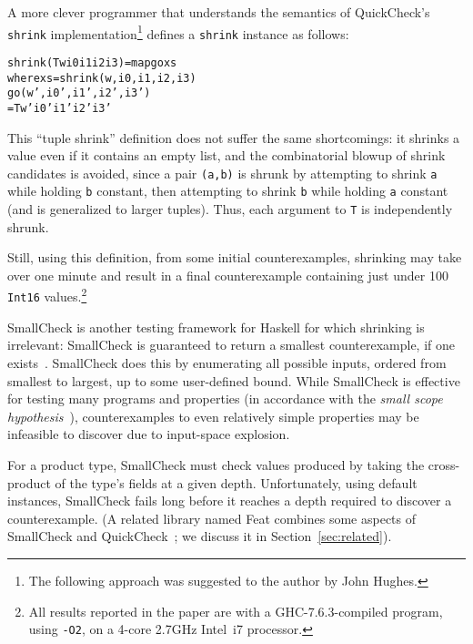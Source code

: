 \documentclass{sigplanconf}
\newenvironment{code}{\begin{alltt}\footnotesize}{\end{alltt}}
\newcommand{\ttp}[1]{\texttt{#1}}
\begin{document}
A more clever programmer that understands the semantics of QuickCheck's
\ttp{shrink} implementation\footnote{The following approach was suggested to
  the author by John Hughes.} defines a \ttp{shrink} instance as follows:
%
\begin{code}
shrink (T w i0 i1 i2 i3) = map go xs
  where xs = shrink (w, i0, i1, i2, i3)
        go (w', i0', i1', i2', i3')
           = T w' i0' i1' i2' i3'
\end{code}
%
\noindent
This ``tuple shrink'' definition does not suffer the same shortcomings: it
shrinks a value even if it contains an empty list, and the combinatorial blowup
of shrink candidates is avoided, since a pair \ttp{(a,b)} is shrunk by
attempting to shrink \ttp{a} while holding \ttp{b} constant, then attempting to
shrink \ttp{b} while holding \ttp{a} constant (and is generalized to larger
tuples).  Thus, each argument to \ttp{T} is independently shrunk.

Still, using this definition, from some initial counterexamples, shrinking may
take over one minute and result in a final counterexample containing just under
100 \ttp{Int16} values.\footnote{All results reported in the paper are with a
  GHC-7.6.3-compiled program, using \ttp{-O2}, on a 4-core 2.7GHz Intel~i7
  processor.}

SmallCheck is another testing framework for Haskell for which shrinking is
irrelevant: SmallCheck is guaranteed to return a smallest counterexample, if
one exists~\cite{sc}.  SmallCheck does this by enumerating all possible inputs,
ordered from smallest to largest, up to some user-defined bound.  While
SmallCheck is effective for testing many programs and properties (in accordance
with the \emph{small scope hypothesis}~\cite{jackson}), counterexamples to even
relatively simple properties may be infeasible to discover due to input-space
explosion.



For a product type, SmallCheck must check values produced by taking the
cross-product of the type's fields at a given depth.  Unfortunately, using
default instances, SmallCheck fails long before it reaches a depth required to
discover a counterexample.  (A related library named Feat combines some aspects
of SmallCheck and QuickCheck~\cite{feat}; we discuss it in
Section~\ref{sec:related}).
\end{document}
